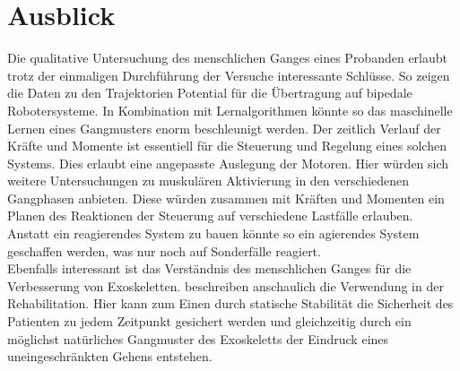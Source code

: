 \section{Ausblick}
Die qualitative Untersuchung des menschlichen Ganges eines Probanden erlaubt trotz der einmaligen Durchführung der Versuche interessante Schlüsse. So zeigen die Daten zu den Trajektorien Potential für die Übertragung auf bipedale Robotersysteme. In Kombination mit Lernalgorithmen könnte so das maschinelle Lernen eines Gangmusters enorm beschleunigt werden. Der zeitlich Verlauf der Kräfte und Momente ist essentiell für die Steuerung und Regelung eines solchen Systems. Dies erlaubt eine angepasste Auslegung der Motoren. Hier würden sich weitere Untersuchungen zu muskulären Aktivierung in den verschiedenen Gangphasen anbieten. Diese würden zusammen mit Kräften und Momenten ein Planen des Reaktionen der Steuerung auf verschiedene Lastfälle erlauben. Anstatt ein reagierendes System zu bauen könnte so ein agierendes System geschaffen werden, was nur noch auf Sonderfälle reagiert.\\
Ebenfalls interessant ist das Verständnis des menschlichen Ganges für die Verbesserung von Exoskeletten. \textcite{barbareschi2015statically} beschreiben anschaulich die Verwendung in der Rehabilitation. Hier kann zum Einen durch statische Stabilität die Sicherheit des Patienten zu jedem Zeitpunkt gesichert werden und gleichzeitig durch ein möglichst natürliches Gangmuster des Exoskeletts der Eindruck eines uneingeschränkten Gehens entstehen.
